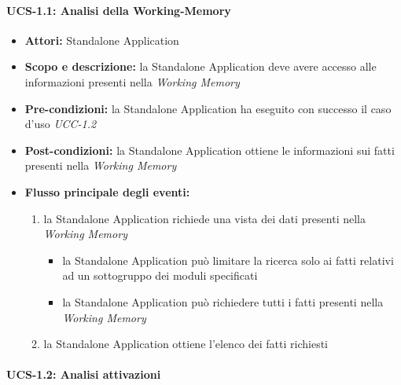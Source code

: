\paragraph{UCS-1.1: Analisi della Working-Memory}

\begin{itemize}
	\item \textbf{Attori:} Standalone Application
	\item \textbf{Scopo e descrizione:} la Standalone Application deve avere accesso alle informazioni presenti nella \emph{Working Memory}
	\item \textbf{Pre-condizioni:} la Standalone Application ha eseguito con successo il caso d'uso \emph{UCC-1.2}
	\item \textbf{Post-condizioni:} la Standalone Application ottiene le informazioni sui fatti presenti nella \emph{Working Memory}
	\item \textbf{Flusso principale degli eventi:}
		\begin{enumerate}
			\item la Standalone Application richiede una vista dei dati presenti nella \emph{Working Memory}
				\begin{itemize}
					\item la Standalone Application può limitare la ricerca solo ai fatti relativi ad un sottogruppo dei moduli specificati
					\item la Standalone Application può richiedere tutti i fatti presenti nella \emph{Working Memory}
				\end{itemize}
			\item la Standalone Application ottiene l'elenco dei fatti richiesti
		\end{enumerate}
\end{itemize}


\paragraph{UCS-1.2: Analisi attivazioni}

